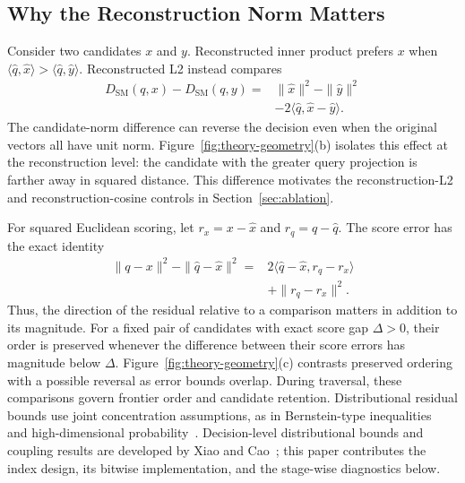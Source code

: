 \subsection{Why the Reconstruction Norm Matters}
Consider two candidates $x$ and $y$. Reconstructed inner product prefers $x$ when
$\langle\widehat q,\widehat x\rangle>
\langle\widehat q,\widehat y\rangle$.
Reconstructed L2 instead compares
\begin{equation}
\begin{split}
 D_{\mathrm{SM}}(q,x)-D_{\mathrm{SM}}(q,y)
 ={}&\|\widehat x\|^2-\|\widehat y\|^2\\
 &-2\langle\widehat q,\widehat x-\widehat y\rangle.
\end{split}
\label{eq:normgap}
\end{equation}
The candidate-norm difference can reverse the decision even when the original vectors all have unit norm. Figure~\ref{fig:theory-geometry}(b) isolates this effect at the reconstruction level: the candidate with the greater query projection is farther away in squared distance. This difference motivates the reconstruction-L2 and reconstruction-cosine controls in Section~\ref{sec:ablation}.

For squared Euclidean scoring, let $r_x=x-\widehat x$ and $r_q=q-\widehat q$. The score error has the exact identity
\begin{equation}
\begin{split}
 \|q-x\|^2-\|\widehat q-\widehat x\|^2
 ={}&2\langle\widehat q-\widehat x,r_q-r_x\rangle\\
 &+\|r_q-r_x\|^2.
\end{split}
\label{eq:residual}
\end{equation}
Thus, the direction of the residual relative to a comparison matters in addition to its magnitude. For a fixed pair of candidates with exact score gap $\Delta>0$, their order is preserved whenever the difference between their score errors has magnitude below $\Delta$. Figure~\ref{fig:theory-geometry}(c) contrasts preserved ordering with a possible reversal as error bounds overlap. During traversal, these comparisons govern frontier order and candidate retention. Distributional residual bounds use joint concentration assumptions, as in Bernstein-type inequalities~\cite{bernstein1924,boucheron2013concentration} and high-dimensional probability~\cite{vershynin2018highdim}. Decision-level distributional bounds and coupling results are developed by Xiao and Cao~\cite{xiao2026decisions}; this paper contributes the index design, its bitwise implementation, and the stage-wise diagnostics below.

